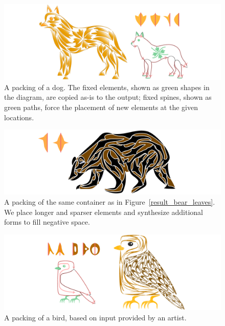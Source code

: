 \begin{figure}[h!]
\centering
\includegraphics[width=1.0\textwidth]{figures/flowpak/dog_flower.pdf}
\caption[A packing of a dog]
{A packing of a dog. The fixed elements, shown as green
  shapes in the diagram, are copied as-is to the output; fixed spines,
  shown as green paths, force the placement of new elements at the given
  locations.}
\label{result_dog}
\end{figure}

\begin{figure}[h!]
\centering
\includegraphics[width=1.0\textwidth]{figures/flowpak/bear_offset_space.pdf}
\caption[A packing of a bear with elements created from negative space]
{A packing of the same container as in Figure~\ref{result_bear_leaves}.
  We place longer and sparser elements and synthesize additional forms to
  fill negative space.}
\label{result_bear_offset}
\end{figure}

\begin{figure}[h!]
\centering
\includegraphics[width=1.0\textwidth]{figures/flowpak/bird_square.pdf}
\caption[A packing of a bird]
{A packing of a bird, based on input provided by
  an artist.}
\label{bird_square}
\end{figure}

